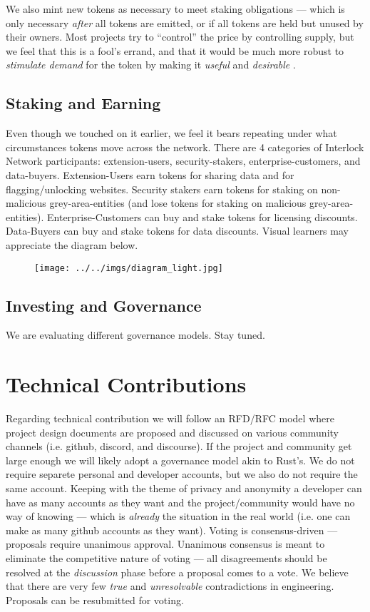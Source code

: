 \documentclass[a4paper]{article}
\begin{document}
We also mint new tokens as necessary to meet staking obligations ---
which is only necessary \emph{after} all tokens are emitted, or if all
tokens are held but unused by their owners. Most projects try to
``control'' the price by controlling supply, but we feel that this is a
fool's errand, and that it would be much more robust to \emph{stimulate
demand} for the token by making it \emph{useful} and \emph{desirable
}.

\subsection{Staking and Earning}

Even though we touched on it earlier, we feel it bears repeating under
what circumstances tokens move across the network. There are 4
categories of Interlock Network participants: extension-users,
security-stakers, enterprise-customers, and data-buyers. Extension-Users
earn tokens for sharing data and for flagging/unlocking websites.
Security stakers earn tokens for staking on non-malicious
grey-area-entities (and lose tokens for staking on malicious
grey-area-entities). Enterprise-Customers can buy and stake tokens for
licensing discounts. Data-Buyers can buy and stake tokens for data
discounts. Visual learners may appreciate the diagram below.

\begin{figure}
\texttt{[image: ../../imgs/diagram\_light.jpg]}
\end{figure}


\subsection{Investing and Governance}

We are evaluating different governance models. Stay tuned.

\section{Technical Contributions}

Regarding technical contribution we will follow an RFD/RFC model where
project design documents are proposed and discussed on various community
channels (i.e. github, discord, and discourse). If the project and
community get large enough we will likely adopt a governance model akin
to Rust's. We do not require separete personal and developer accounts,
but we also do not require the same account. Keeping with the theme of
privacy and anonymity a developer can have as many accounts as they want
and the project/community would have no way of knowing --- which is
\emph{already} the situation in the real world (i.e. one can make as
many github accounts as they want). Voting is consensus-driven ---
proposals require unanimous approval. Unanimous consensus is meant to
eliminate the competitive nature of voting --- all disagreements should
be resolved at the \emph{discussion} phase before a proposal comes to
a vote. We believe that there are very few \emph{true} and \emph{
unresolvable} contradictions in engineering. Proposals can be
resubmitted for voting.
\end{document}
